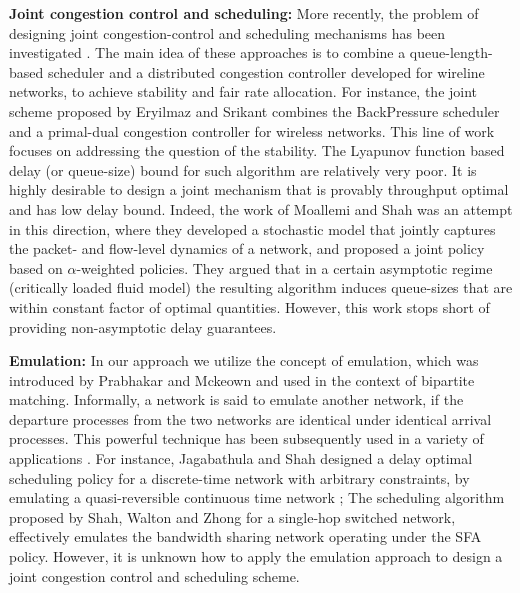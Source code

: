 \documentclass[ssy,preprint]{imsart_axv}
\numberwithin{equation}{section}
\theoremstyle{plain}
\theoremstyle{definition}
\theoremstyle{remark}
\theoremstyle{plain}
\theoremstyle{plain}
\begin{document}
\medskip
\noindent\textbf{Joint congestion control and scheduling:} More recently, the
problem of designing joint congestion-control and scheduling mechanisms
has been investigated \cite{eryilmaz2006joint,lin2004joint,stolyar2005maximizing}.
The main idea of these approaches is to combine a queue-length-based
scheduler and a distributed congestion controller developed for wireline
networks, to achieve stability and fair rate allocation. For instance,
the joint scheme proposed by Eryilmaz and Srikant combines the BackPressure
scheduler and a primal-dual congestion controller for wireless networks.
This line of work focuses on addressing the question of the stability. The
Lyapunov function based delay (or queue-size) bound for such algorithm are
relatively very poor. It is highly desirable to design a joint mechanism that is provably
throughput optimal and has low delay bound. Indeed, the work of Moallemi and Shah \cite{moallemi2010flow} was an attempt in this direction, where they
developed a stochastic model that jointly captures the packet- and 
flow-level dynamics of a network, and proposed a joint policy based on 
$\alpha$-weighted policies. They argued that in a certain asymptotic regime 
(critically loaded fluid model) the resulting algorithm induces queue-sizes that are
within constant factor of optimal quantities. However, this work stops short of 
providing non-asymptotic delay guarantees.

\medskip
\noindent\textbf{Emulation:} In our approach we utilize the concept of emulation,
which was introduced by Prabhakar and Mckeown \cite{prabhakar1999speedup}
and used in the context of bipartite matching. Informally, a network
is said to emulate another network, if the departure processes from
the two networks are identical under identical arrival processes.
This powerful technique has been subsequently used in a variety of
applications \cite{jagabathula2008delay_scheduling,shah2014SFA,gamal2006throughput_delay,chuang1999matching}.
For instance, Jagabathula and Shah designed a delay optimal scheduling
policy for a discrete-time network with arbitrary constraints, by
emulating a quasi-reversible continuous time network \cite{jagabathula2008delay_scheduling};
The scheduling algorithm proposed by Shah, Walton and Zhong \cite{shah2014SFA}
for a single-hop switched network, effectively emulates the bandwidth sharing
network operating under the SFA policy. However, it is unknown how
to apply the emulation approach to design a joint congestion control
and scheduling scheme.
\end{document}
